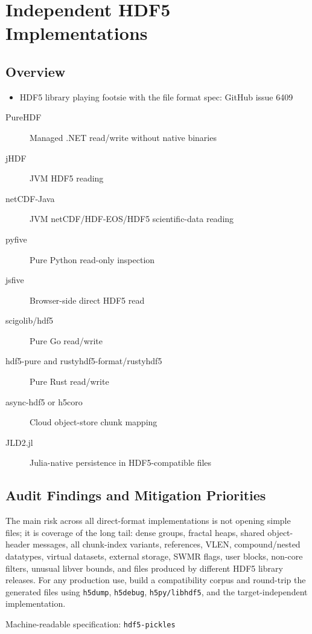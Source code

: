 \documentclass[../main.tex]{subfiles}
\begin{document}
\section{Independent HDF5 Implementations}
\label{sec:indie}

\subsection{Overview}

\begin{itemize}
    \item HDF5 library playing footsie with the file format spec: GitHub issue 6409 \cite{hdf5-gh-issue-6409}
\end{itemize}

\begin{description}
    \item[PureHDF] Managed .NET read/write without native binaries
    \item[jHDF] JVM HDF5 reading
    \item[netCDF-Java] JVM netCDF/HDF-EOS/HDF5 scientific-data reading 
    \item[pyfive] Pure Python read-only inspection
    \item[jsfive] Browser-side direct HDF5 read
    \item[scigolib/hdf5] Pure Go read/write 
    \item[hdf5-pure and rustyhdf5-format/rustyhdf5] Pure Rust read/write
    \item[async-hdf5 or h5coro] Cloud object-store chunk mapping
    \item[JLD2.jl]  Julia-native persistence in HDF5-compatible files
\end{description}



\subsection{Audit Findings and Mitigation Priorities}

The main risk across all direct-format implementations is not opening simple files; it is coverage of the long tail: dense groups, fractal heaps, shared object-header messages, all chunk-index variants, references, VLEN, compound/nested datatypes, virtual datasets, external storage, SWMR flags, user blocks, non-core filters, unusual libver bounds, and files produced by different HDF5 library releases. For any production use, build a compatibility corpus and round-trip the generated files using \texttt{h5dump}, \texttt{h5debug}, \texttt{h5py/libhdf5}, and the target-independent implementation.

Machine-readable specification: \texttt{hdf5-pickles}
\end{document}

